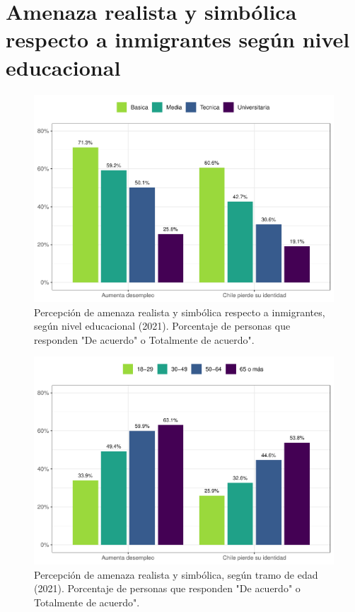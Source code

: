 \documentclass[
  12pt,
]{book}
\begin{document}
\hypertarget{amenaza-realista-y-simbuxf3lica-respecto-a-inmigrantes-seguxfan-nivel-educacional}{%
\section{Amenaza realista y simbólica respecto a inmigrantes según nivel educacional}\label{amenaza-realista-y-simbuxf3lica-respecto-a-inmigrantes-seguxfan-nivel-educacional}}

\begin{figure}

{\centering \includegraphics{reporte-elsoc_files/figure-latex/amen-educ-1} 

}

\caption{Percepción de amenaza realista y simbólica respecto a inmigrantes, según nivel educacional (2021). Porcentaje de personas que responden "De acuerdo" o Totalmente de acuerdo".}\label{fig:amen-educ}
\end{figure}

\begin{figure}

{\centering \includegraphics{reporte-elsoc_files/figure-latex/amen-edad-1} 

}

\caption{Percepción de amenaza realista y simbólica, según tramo de edad (2021). Porcentaje de personas que responden "De acuerdo" o Totalmente de acuerdo".}\label{fig:amen-edad}
\end{figure}
\end{document}
